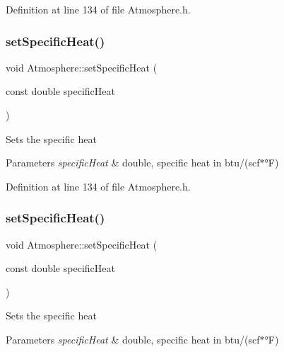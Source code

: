 Definition at line 134 of file Atmosphere.\+h.

\mbox{\label{class_atmosphere_a17450de3bc7a64b2736b1fe8785410cd}} 
\subsubsection{\texorpdfstring{set\+Specific\+Heat()}{setSpecificHeat()}\hspace{0.1cm}{\footnotesize\ttfamily [2/3]}}
{\footnotesize\ttfamily void Atmosphere\+::set\+Specific\+Heat (\begin{DoxyParamCaption}\item[{const double}]{specific\+Heat }\end{DoxyParamCaption})\hspace{0.3cm}{\ttfamily [inline]}}

Sets the specific heat 
\begin{DoxyParams}{Parameters}
{\em specific\+Heat} & double, specific heat in btu/(scf$\ast$°F) \\
\hline
\end{DoxyParams}


Definition at line 134 of file Atmosphere.\+h.

\mbox{\label{class_atmosphere_a17450de3bc7a64b2736b1fe8785410cd}} 
\subsubsection{\texorpdfstring{set\+Specific\+Heat()}{setSpecificHeat()}\hspace{0.1cm}{\footnotesize\ttfamily [3/3]}}
{\footnotesize\ttfamily void Atmosphere\+::set\+Specific\+Heat (\begin{DoxyParamCaption}\item[{const double}]{specific\+Heat }\end{DoxyParamCaption})\hspace{0.3cm}{\ttfamily [inline]}}

Sets the specific heat 
\begin{DoxyParams}{Parameters}
{\em specific\+Heat} & double, specific heat in btu/(scf$\ast$°F) \\
\hline
\end{DoxyParams}


